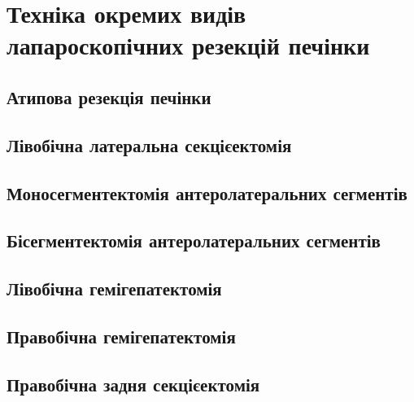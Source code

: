 \chapter{Техніка окремих видів лапароскопічних резекцій печінки} 

\begin{refsection}

\section{Атипова резекція печінки}

\section{Лівобічна латеральна секцієектомія}

\section{Моносегментектомія антеролатеральних сегментів}

\section{Бісегментектомія антеролатеральних сегментів}

\section{Лівобічна гемігепатектомія}

\section{Правобічна гемігепатектомія}

\section{Правобічна задня секцієектомія}



\printbibliography [heading=subbibliography]
\end{refsection}